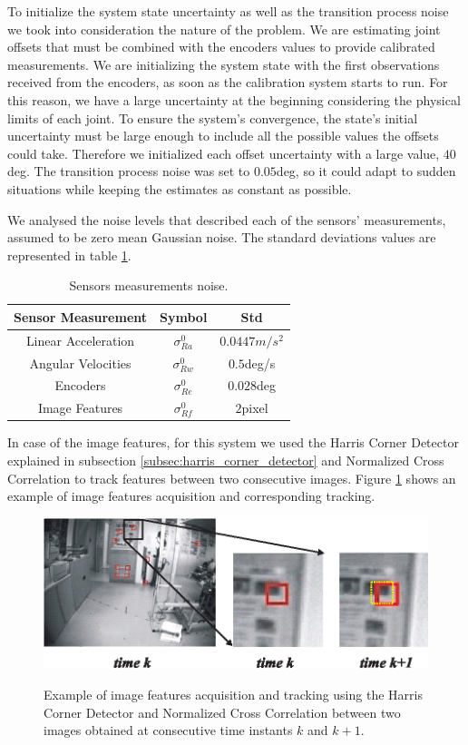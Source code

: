 To initialize the system state uncertainty as well as the transition process noise we took into consideration the nature of the problem. We are estimating joint offsets that must be combined with the encoders values to provide calibrated measurements. We are initializing the system state with the first observations received from the encoders, as soon as the calibration system starts to run. For this reason, we have a large uncertainty at the beginning considering the physical limits of each joint. To ensure the system's convergence, the state's initial uncertainty must be large enough to include all the possible values the offsets could take. Therefore we initialized each offset uncertainty with a large value, $40$deg. The transition process noise was set to $0.05$deg, so it could adapt to sudden situations while keeping the estimates as constant as possible.

We analysed the noise levels that described each of the sensors' measurements, assumed to be zero mean Gaussian noise. The standard deviations values are represented in table \ref{tab:sensors_noise}.

\begin{table}
\centering
\begin{tabular}{ccc}
 \hline
 Sensor Measurement & Symbol & Std \\
 \hline
 Linear Acceleration & $\sigma_{Ra}^{0}$ & $0.0447m/s^2$\\
  Angular Velocities & $\sigma_{Rw}^{0}$ & $0.5$deg/s\\
  Encoders & $\sigma_{Re}^{0}$ & $0.028$deg\\
  Image Features & $\sigma_{Rf}^{0}$ & $2$pixel\\
 \hline
\end{tabular}
\caption{Sensors measurements noise.}
\label{tab:sensors_noise}
\end{table}

In case of the image features, for this system we used the Harris Corner Detector explained in subsection \ref{subsec:harris_corner_detector} and Normalized Cross Correlation to track features between two consecutive images. Figure \ref{fig:harris_corners_tracking} shows an example of image features acquisition and corresponding tracking.

\begin{figure}
\centering
\includegraphics[width=0.75\columnwidth]{images/harris_corners_tracking}
\label{fig:harris_corners_tracking}
\caption{Example of image features acquisition and tracking using the Harris Corner Detector and Normalized Cross Correlation between two images obtained at consecutive time instants $k$ and $k+1$.}
\end{figure}

